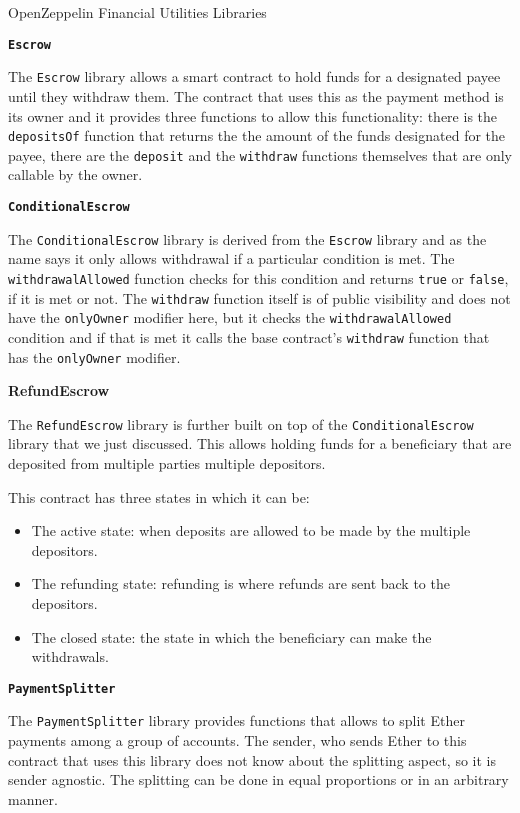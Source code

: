 OpenZeppelin Financial Utilities Libraries

\textbf{\texttt{Escrow}}

The \texttt{Escrow} library allows a smart contract to hold funds for a
designated payee until they withdraw them. The contract that uses this
as the payment method is its owner and it provides three functions to
allow this functionality: there is the \texttt{depositsOf} function that
returns the the amount of the funds designated for the payee, there are
the \texttt{deposit} and the \texttt{withdraw} functions themselves that
are only callable by the owner.

\textbf{\texttt{ConditionalEscrow}}

The \texttt{ConditionalEscrow} library is derived from the
\texttt{Escrow} library and as the name says it only allows withdrawal
if a particular condition is met. The \texttt{withdrawalAllowed}
function checks for this condition and returns \texttt{true} or
\texttt{false}, if it is met or not. The \texttt{withdraw} function
itself is of public visibility and does not have the \texttt{onlyOwner}
modifier here, but it checks the \texttt{withdrawalAllowed} condition
and if that is met it calls the base contract's \texttt{withdraw}
function that has the \texttt{onlyOwner} modifier.

\textbf{RefundEscrow}

The \texttt{RefundEscrow} library is further built on top of the
\texttt{ConditionalEscrow} library that we just discussed. This allows
holding funds for a beneficiary that are deposited from multiple parties
multiple depositors.

This contract has three states in which it can be:

\begin{itemize}
\tightlist
\item
  The active state: when deposits are allowed to be made by the multiple
  depositors.
\item
  The refunding state: refunding is where refunds are sent back to the
  depositors.
\item
  The closed state: the state in which the beneficiary can make the
  withdrawals.
\end{itemize}

\textbf{\texttt{PaymentSplitter}}

The \texttt{PaymentSplitter} library provides functions that allows to
split Ether payments among a group of accounts. The sender, who sends
Ether to this contract that uses this library does not know about the
splitting aspect, so it is sender agnostic. The splitting can be done in
equal proportions or in an arbitrary manner.

